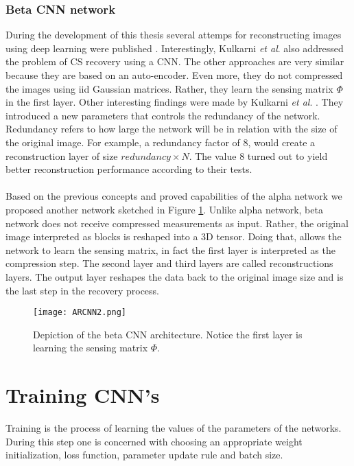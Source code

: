 \FloatBarrier

\subsubsection{Beta CNN network} \label{ch:betaNet}
During the development of this thesis several attemps for reconstructing images using deep learning were published \cite{kulkarni2016reconnet,mousavi2015deep,iliadis2016deep,iliadis2016deepbinarymask,adler2016deep}. Interestingly, Kulkarni \textit{et al}. \cite{kulkarni2016reconnet} also addressed the problem of CS recovery using a CNN. The other approaches are very similar because they are based on an auto-encoder.  Even more, they do not compressed the images using iid Gaussian matrices. Rather, they learn the sensing matrix $\Phi$ in the first layer. Other interesting findings were made by Kulkarni \textit{et al}. \cite{kulkarni2016reconnet}. They introduced a new parameters that controls the redundancy of the network. Redundancy refers to how large the network will be in relation with the size of the original image. For example, a redundancy factor of 8, would create a reconstruction layer of size $redundancy \times N$. The value 8 turned out to yield better reconstruction performance according to their tests.\\\\
Based on the previous concepts and proved capabilities of the alpha network we proposed another network sketched in Figure \ref{fig:ARCNNim2}. Unlike alpha network, beta network does not receive compressed measurements as input. Rather, the original image interpreted as blocks is reshaped into a 3D tensor. Doing that, allows the network to learn the sensing matrix, in fact the first layer is interpreted as the compression step. The second layer and third layers are called reconstructions layers. The output layer reshapes the data back to the original image size and is the last step in the recovery process.         
\begin{figure}[tb] 
\centering 
\texttt{[image: ARCNN2.png]} 
\caption[Beta CNN architecture for recovery ]{Depiction of the beta CNN architecture. Notice the first layer is learning the sensing matrix $\Phi$.}
\label{fig:ARCNNim2} 
\end{figure}

\FloatBarrier

\section{Training CNN's}
Training is the process of learning the values of the parameters of the networks. During this step one is concerned with choosing an appropriate weight initialization, loss function, parameter update rule and batch size.

